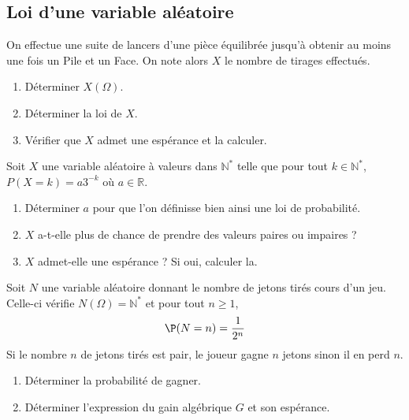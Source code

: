 \documentclass[a4paper,twoside,french,11pt]{VcCours}
\begin{document}

\tableofcontents
\separationTitre


\subsection{Loi d'une variable aléatoire}


\begin{Exercice}{} On effectue une suite de lancers d'une pièce équilibrée jusqu'à obtenir au moins une fois un Pile et un Face. On note alors $X$ le nombre de tirages effectués.

\begin{enumerate}
\item Déterminer $X(\Omega)$.
\item Déterminer la loi de $X$. 
\item Vérifier que $X$ admet une espérance et la calculer.
\end{enumerate}
\end{Exercice}

\begin{Exercice}{}
 Soit $X$ une variable aléatoire à valeurs dans $\mathbb{N}^*$ telle que pour tout $k \in \mathbb{N}^*$, $P(X=k)=a3^{-k}$ où $a \in \mathbb{R}$.
\begin{enumerate}
\item Déterminer $a$ pour que l'on définisse bien ainsi une loi de probabilité.
\item $X$ a-t-elle plus de chance de prendre des valeurs paires ou impaires ?
\item $X$ admet-elle une espérance ? Si oui, calculer la.
\end{enumerate}
\end{Exercice}



\begin{Exercice}{} Soit $N$ une variable aléatoire donnant le nombre de jetons tirés cours d'un jeu. Celle-ci vérifie $N(\Omega)= \mathbb{N}^*$ et pour tout $n \geq 1$,
$$ \P(N=n) = \dfrac{1}{2^n}$$
Si le nombre $n$ de jetons tirés est pair, le joueur gagne $n$ jetons sinon il en perd $n$.
\begin{enumerate}
\item Déterminer la probabilité de gagner.
\item Déterminer l'expression du gain algébrique $G$ et son espérance.
\end{enumerate}
\end{Exercice}
\end{document}

